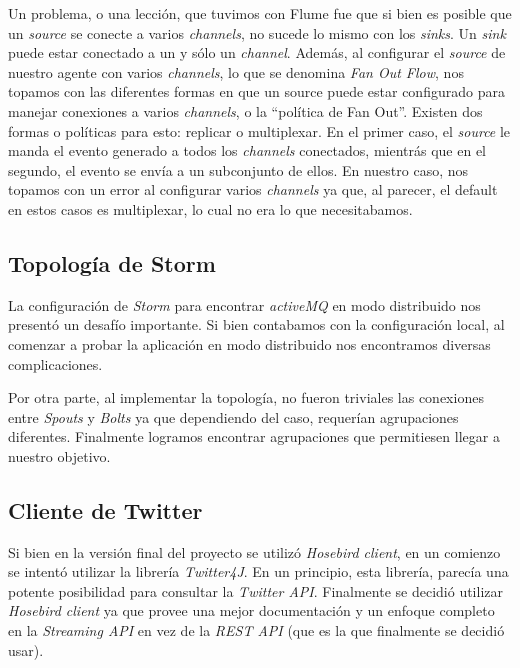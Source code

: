 \documentclass[a4paper,10pt]{article}
\begin{document}
Un problema, o una lección, que tuvimos con Flume fue que si bien es posible que un \textit{source} se conecte a varios \textit{channels}, no sucede lo mismo con los \textit{sinks}.
Un \textit{sink} puede estar conectado a un y sólo un \textit{channel}. Además, al configurar el \textit{source} de nuestro agente con varios \textit{channels}, lo que
se denomina \textit{Fan Out Flow}, nos topamos con las
diferentes formas en que un source puede estar configurado para manejar conexiones a varios \textit{channels}, o la ``política de Fan Out''. Existen dos formas o políticas para esto:
replicar o multiplexar. En el primer caso, el \textit{source} le manda el evento generado a todos los \textit{channels} conectados, mientrás que en el segundo, el evento se envía
a un subconjunto de ellos. En nuestro caso, nos topamos con un error al configurar varios \textit{channels} ya que, al parecer, el default en estos casos es multiplexar, lo cual no
era lo que necesitabamos.

\subsection{Topología de Storm}

La configuración de \textit{Storm} para encontrar \textit{activeMQ} en modo distribuido nos presentó un desafío importante. Si bien contabamos con la configuración local, 
al comenzar a probar la aplicación en modo distribuido nos encontramos diversas complicaciones.

Por otra parte, al implementar la topología, no fueron triviales las conexiones entre \textit{Spouts} y \textit{Bolts} ya que dependiendo del caso, requerían agrupaciones
diferentes. Finalmente logramos encontrar agrupaciones que permitiesen llegar a nuestro objetivo.

\subsection{Cliente de Twitter}

Si bien en la versión final del proyecto se utilizó \textit{Hosebird client}, en un comienzo se intentó utilizar la librería \textit{Twitter4J}. En un principio, esta librería,
parecía una potente posibilidad para consultar la \textit{Twitter API}. Finalmente se decidió utilizar \textit{Hosebird client} ya que provee una mejor documentación y un enfoque
completo en la \textit{Streaming API} en vez de la \textit{REST API} (que es la que finalmente se decidió usar).
\end{document}
